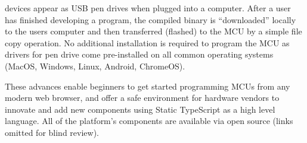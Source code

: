 \MC devices appear as USB pen drives when plugged into a computer. After a user has finished developing a program, the compiled binary is ``downloaded'' locally to the users computer and then transferred (flashed) to the MCU by a simple file copy operation. No additional installation is required to program the MCU as drivers for pen drive come pre-installed on all common operating systems (MacOS, Windows, Linux, Android, ChromeOS).

These advances enable beginners to get started programming MCUs from any modern web browser, and offer a safe environment for hardware vendors to innovate and add new components using Static TypeScript as a high level language. All of the platform's components are available via open source (links omitted for blind review).